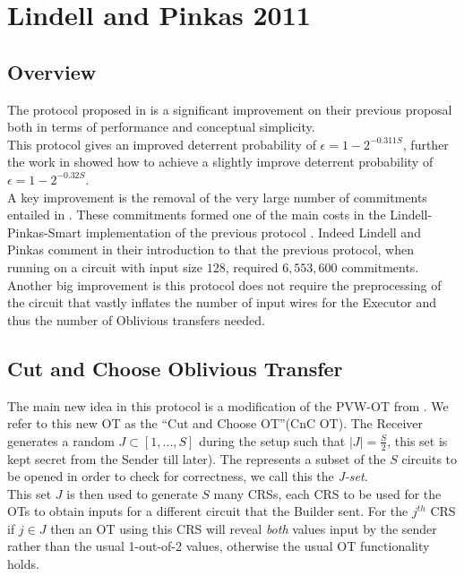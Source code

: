 \documentclass[ %
                    author={Nicholas Tutte},
                supervisor={Prof. Nigel Smart},
                    degree={MEng},
                     title={Secure Two Party Computation},
                  subtitle={A practical comparison of recent protocols},
                      type={Research - GG1K},
                      year={2015} ]{dissertation}
\begin{document}
		\section{Lindell and Pinkas 2011}
			\subsection{Overview}
				The protocol proposed in \cite{LindellAndPinkas2011} is a significant improvement on their previous proposal \cite{LindellAndPinkas2007} both in terms of performance and conceptual simplicity.\\

				This protocol gives an improved deterrent probability of $\epsilon = 1 - 2^{-0.311 S}$, further the work in \cite{ShelatAndShen} showed how to achieve a slightly improve deterrent probability of $\epsilon = 1 - 2^{-0.32 S}$.\\

				A key improvement is the removal of the very large number of commitments entailed in \cite{LindellAndPinkas2007}. These commitments formed one of the main costs in the Lindell-Pinkas-Smart implementation of the previous protocol \cite{LindellPinkasSmart2008}. Indeed Lindell and Pinkas comment in their introduction to \cite{LindellAndPinkas2011} that the previous protocol, when running on a circuit with input size $128$, required $6,553,600$ commitments.\\

				Another big improvement is this protocol does not require the preprocessing of the circuit that vastly inflates the number of input wires for the Executor and thus the number of Oblivious transfers needed.

			\subsection{Cut and Choose Oblivious Transfer}
				The main new idea in this protocol is a modification of the PVW-OT from \cite{PVW_OT_2008}. We refer to this new OT as the ``Cut and Choose OT''(CnC OT). The Receiver generates a random $J \subset [1, ..., S]$ during the setup such that $\vert J \vert = \frac{S}{2}$,  this set is kept secret from the Sender till later). The represents a subset of the $S$ circuits to be opened in order to check for correctness, we call this the \emph{J-set}.\\

				This set $J$ is then used to generate $S$ many CRSs, each CRS to be used for the OTs to obtain inputs for a different circuit that the Builder sent. For the $j^{th}$ CRS if $j \in J$ then an OT using this CRS will reveal \emph{both} values input by the sender rather than the usual 1-out-of-2 values, otherwise the usual OT functionality holds.\\
\end{document}
